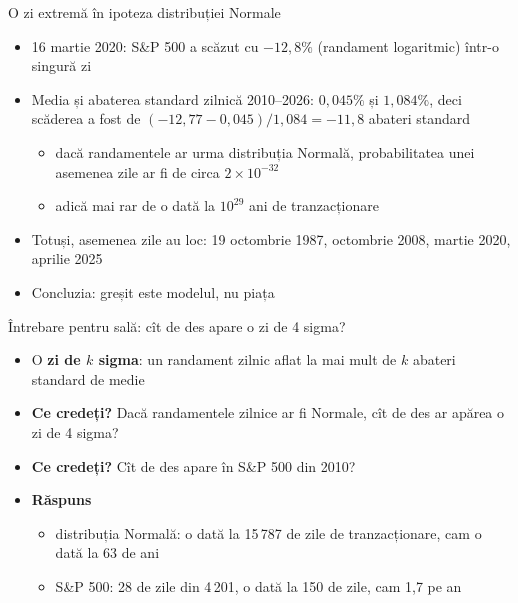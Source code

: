 \begin{frame}{O zi extremă în ipoteza distribuției Normale}
\itemsize{\small}
\begin{itemize}
    \item 16 martie 2020: S\&P 500 a scăzut cu $-12{,}8\%$ (randament logaritmic) într-o singură zi
    \item Media și abaterea standard zilnică 2010--2026: $0{,}045\%$ și $1{,}084\%$, deci scăderea a fost de $(-12{,}77 - 0{,}045)/1{,}084 = -11{,}8$ abateri standard
    \begin{itemize}
        \item dacă randamentele ar urma distribuția Normală, probabilitatea unei asemenea zile ar fi de circa $2 \times 10^{-32}$
        \item adică mai rar de o dată la $10^{29}$ ani de tranzacționare
    \end{itemize}
    \item Totuși, asemenea zile au loc: 19 octombrie 1987, octombrie 2008, martie 2020, aprilie 2025
    \item Concluzia: greșit este modelul, nu piața
\end{itemize}
\end{frame}

\begin{frame}{Întrebare pentru sală: cît de des apare o zi de 4 sigma?}
\itemsize{\small}
\begin{itemize}
    \item O \textbf{zi de $k$ sigma}: un randament zilnic aflat la mai mult de $k$ abateri standard de medie
    \item \textbf{Ce credeți?} Dacă randamentele zilnice ar fi Normale, cît de des ar apărea o zi de 4 sigma?
    \item \textbf{Ce credeți?} Cît de des apare în S\&P 500 din 2010?
    \item \textbf{Răspuns}
    \begin{itemize}
        \item distribuția Normală: o dată la 15\,787 de zile de tranzacționare, cam o dată la 63 de ani
        \item S\&P 500: 28 de zile din 4\,201, o dată la 150 de zile, cam 1{,}7 pe an
    \end{itemize}
\end{itemize}
\end{frame}

